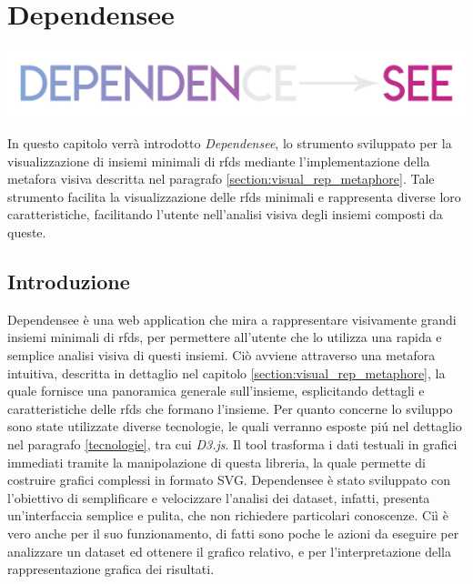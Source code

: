 \chapter{Dependensee}
\label{cap5:dependensee}
\begin{center}
    \includegraphics[width=.5\columnwidth]{capitoli/figure/logo_dependensee}
\end{center}

In questo capitolo verr\`{a} introdotto \textit{Dependensee}, lo strumento sviluppato per la visualizzazione di insiemi minimali di \acrlong{rfds} mediante l'implementazione della metafora visiva descritta nel paragrafo \ref{section:visual_rep_metaphore}. Tale strumento facilita la visualizzazione delle \acrlong{rfds} minimali e rappresenta diverse loro caratteristiche, facilitando l'utente nell'analisi visiva degli insiemi composti da queste.

\section{Introduzione} %
Dependensee \`{e} una web application che mira a rappresentare visivamente grandi insiemi minimali di \acrlong{rfds}, per permettere all'utente che lo utilizza una rapida e semplice analisi visiva di questi insiemi. Ci\`{o} avviene attraverso una metafora intuitiva, descritta in dettaglio nel capitolo \ref{section:visual_rep_metaphore}, la quale fornisce una panoramica generale sull'insieme, esplicitando dettagli e caratteristiche delle \acrlong{rfds} che formano l'insieme. Per quanto concerne lo sviluppo sono state utilizzate diverse tecnologie, le quali verranno esposte pi\'{u} nel dettaglio nel paragrafo \ref{tecnologie}, tra cui \textit{D3.js}. Il tool trasforma i dati testuali in grafici immediati tramite la manipolazione di questa libreria, la quale permette di costruire grafici complessi in formato SVG. Dependensee \`{e} stato sviluppato con l'obiettivo di semplificare e velocizzare l'analisi dei dataset, infatti, presenta un'interfaccia semplice e pulita, che non richiedere particolari conoscenze. Ci\`{i} \`{e} vero anche per il suo funzionamento, di fatti sono poche le azioni da eseguire per analizzare un dataset ed ottenere il grafico relativo, e per l'interpretazione della rappresentazione grafica dei risultati.

